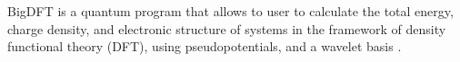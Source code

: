 BigDFT is a quantum program that allows to user to calculate the total energy, charge density, and electronic structure of systems in the framework of density functional theory (DFT), using pseudopotentials, and a wavelet basis \cite{Genovese_2008}\cite{Genovese_2008}\cite{Mohr_2014}.